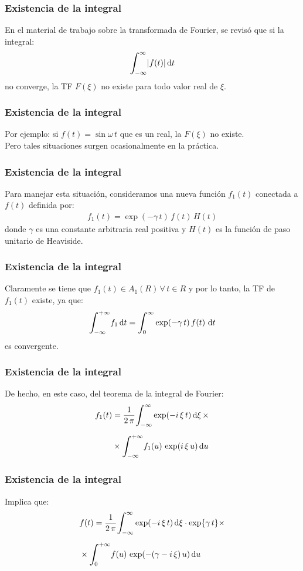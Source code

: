 \begin{frame}
\frametitle{Existencia de la integral}
En el material de trabajo sobre la transformada de Fourier, se revisó que si la integral:
\pause
\begin{align*}
\scaleint{6ex}_{\bs -\infty}^{\infty} \abs{f (t)} \dd{t}
\end{align*}
no converge, \pause la TF $F (\xi)$ no existe para todo valor real de $\xi$.
\end{frame}
\begin{frame}
\frametitle{Existencia de la integral}
Por ejemplo: si $f (t) = \sin \omega \, t$ que es un real, \pause la $F (\xi)$ no existe.
\\
\bigskip
\pause
Pero tales situaciones surgen ocasionalmente en la práctica.
\end{frame}
\begin{frame}
\frametitle{Existencia de la integral}
Para manejar esta situación, consideramos una nueva función $f_{1} (t)$ conectada a $f (t)$ definida por:
\pause
\begin{align*}
f_{1} (t) =  \exp(- \gamma \, t) \, f (t) \, H (t)
\end{align*}
donde $\gamma$ es una constante arbitraria real positiva y $H (t)$ es la función de paso unitario de Heaviside.
\end{frame}
\begin{frame}
\frametitle{Existencia de la integral}
Claramente se tiene que $f_{1} (t) \in A_{1} (R) \, \forall \, t \in R$ y por lo tanto, la TF de $f_{1} (t)$ existe, ya que:
\pause
\begin{align*}
\scaleint{6ex}_{\bs -\infty}^{+\infty} f_{1} \dd{t} = \scaleint{6ex}_{\bs 0}^{\infty} \exp(-\gamma \, t) \, f (t) \, \dd{t}
\end{align*}
es convergente.
\end{frame}
\begin{frame}
\frametitle{Existencia de la integral}
De hecho, en este caso, del teorema de la integral de Fourier:
\pause
\begin{align*}
f_{1} (t) &= \dfrac{1}{2 \, \pi} \scaleint{6ex}_{\bs -\infty}^{\infty} \exp(-i \, \xi \, t) \dd{\xi} \times \\[0.5em]
&\times \scaleint{6ex}_{\bs -\infty}^{+\infty} f_{1} (u) \, \exp(i \, \xi \, u) \dd{u}
\end{align*}
\end{frame}
\begin{frame}
\frametitle{Existencia de la integral}
Implica que:
\pause
\begin{align*}
&f (t) = \dfrac{1}{2 \, \pi} \scaleint{6ex}_{\bs -\infty}^{\infty} \exp(-i \, \xi \, t) \dd{\xi} \cdot \exp{\gamma \, t} \times \\[0.5em]
&\times \scaleint{6ex}_{\bs 0}^{+\infty} f (u) \, \exp(- (\gamma - i \, \xi) \, u) \dd{u}
\end{align*}
\end{frame}
